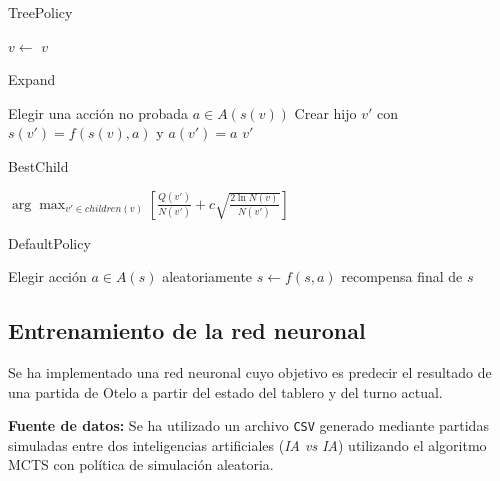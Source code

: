 \documentclass[conference,a4paper]{IEEEtran}
\begin{document}
\begin{algorithm}[H]
\caption{TreePolicy}
\begin{algorithmic}[1]
            \State \Return {}
        \Else
            \State $v \gets$ 
        \EndIf
    \EndWhile
    \State \Return $v$
\EndFunction
\end{algorithmic}
\end{algorithm}

\begin{algorithm}[H]
\caption{Expand}
\begin{algorithmic}[1]
    \State Elegir una acción no probada $a \in A(s(v))$
    \State Crear hijo $v'$ con $s(v') = f(s(v), a)$ y $a(v') = a$
    \State \Return $v'$
\EndFunction
\end{algorithmic}
\end{algorithm}

\begin{algorithm}[H]
\caption{BestChild}
\begin{algorithmic}[1]
    \State \Return $\arg\max_{v' \in children(v)} \left[\frac{Q(v')}{N(v')} + c \sqrt{\frac{2 \ln N(v)}{N(v')}}\right]$
\EndFunction
\end{algorithmic}
\end{algorithm}

\begin{algorithm}[H]
\caption{DefaultPolicy}
\begin{algorithmic}[1]
        \State Elegir acción $a \in A(s)$ aleatoriamente
        \State $s \gets f(s, a)$
    \EndWhile
    \State \Return recompensa final de $s$
\EndFunction
\end{algorithmic}
\end{algorithm}

\subsection{Entrenamiento de la red neuronal}

Se ha implementado una red neuronal cuyo objetivo es predecir el resultado de una partida de Otelo a partir del estado del tablero y del turno actual.

\textbf{Fuente de datos:} Se ha utilizado un archivo \texttt{CSV} generado mediante partidas simuladas entre dos inteligencias artificiales (\textit{IA vs IA}) utilizando el algoritmo MCTS con política de simulación aleatoria.
\end{document}
